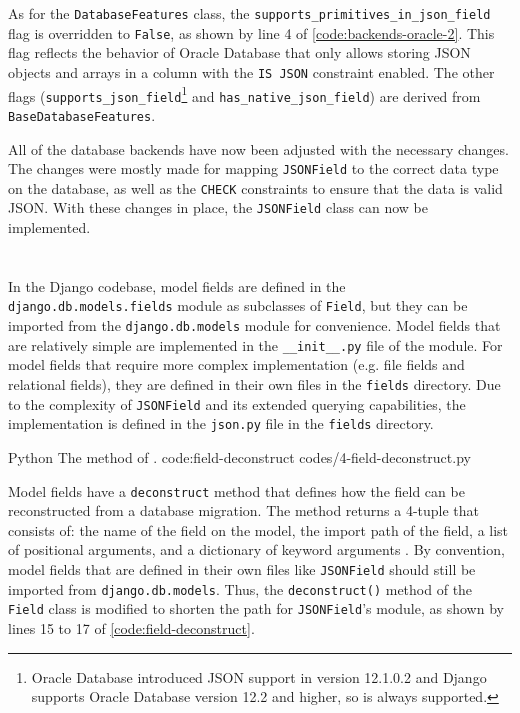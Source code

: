 As for the \verb|DatabaseFeatures| class, the \verb|supports_primitives_in_json_field|
flag is overridden to \verb|False|, as shown by line 4 of
\autoref{code:backends-oracle-2}. This flag reflects the behavior of Oracle
Database that only allows storing JSON objects and arrays in a column with the
\verb|IS JSON| constraint enabled. The other flags
(\verb|supports_json_field|\footnote{Oracle Database introduced JSON support in
version 12.1.0.2 and Django supports Oracle Database version 12.2 and higher,
so  is always supported.} and \verb|has_native_json_field|) are
derived from \verb|BaseDatabaseFeatures|.

All of the database backends have now been adjusted with the necessary changes.
The changes were mostly made for mapping \verb|JSONField| to the correct data
type on the database, as well as the \verb|CHECK| constraints to ensure that
the data is valid JSON. With these changes in place, the \verb|JSONField| class
can now be implemented.

\section{}

In the Django codebase, model fields are defined in the
\verb|django.db.models.fields| module as subclasses of \verb|Field|, but they
can be imported from the \verb|django.db.models| module for convenience. Model
fields that are relatively simple are implemented in the \verb|__init__.py|
file of the module. For model fields that require more complex implementation
(e.g. file fields and relational fields), they are defined in their own files
in the \verb|fields| directory. Due to the complexity of \verb|JSONField| and
its extended querying capabilities, the implementation is defined in the
\verb|json.py| file in the \verb|fields| directory.

\listing
{Python}
{The  method of .}
{code:field-deconstruct}
{codes/4-field-deconstruct.py}

Model fields have a \verb|deconstruct| method that defines how the field can be
reconstructed from a database migration. The method returns a 4-tuple that
consists of: the name of the field on the model, the import path of the field,
a list of positional arguments, and a dictionary of keyword arguments
\cite{django:model_fields}. By convention, model fields that are defined in
their own files like \verb|JSONField| should still be imported from
\verb|django.db.models|. Thus, the \verb|deconstruct()| method of the
\verb|Field| class is modified to shorten the path for \verb|JSONField|'s
module, as shown by lines 15 to 17 of \autoref{code:field-deconstruct}.

